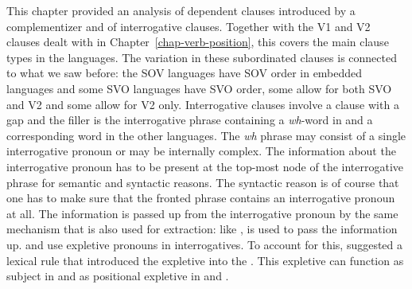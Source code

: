 This chapter provided an analysis of dependent clauses introduced by a complementizer and of
interrogative clauses. Together with the V1 and V2 clauses dealt with in Chapter~\ref{chap-verb-position}, this covers
the main clause types in the  languages. The variation in these subordinated clauses is
connected to what we saw before: the SOV languages have SOV order in embedded languages and some SVO
languages have SVO order, some allow for both SVO and V2 and some allow for V2 only. Interrogative
clauses involve a clause with a gap and the filler is the interrogative phrase containing a
\emph{wh}-word in  and a corresponding word in the other  languages. The \emph{wh}
phrase may consist of a single interrogative pronoun or may be internally complex. The information
about the interrogative pronoun has to be present at the top-most node of the interrogative phrase
for semantic and syntactic reasons. The syntactic reason is of course that one has to make sure that
the fronted phrase contains an interrogative pronoun at all. The information is passed up from the
interrogative pronoun by the same mechanism that is also used for extraction: like \slasch, \que is used
to pass the information up.  and  use expletive pronouns in interrogatives. To
account for this,  suggested a lexical rule that introduced the expletive into the
\argstl. This expletive can function as subject in  and as positional expletive in  and
.%




